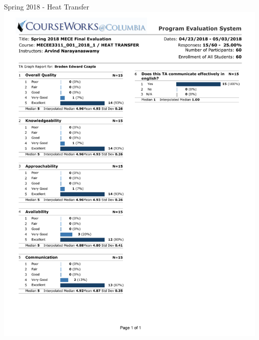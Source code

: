 \newpage Spring 2018 - Heat Transfer
\includegraphics*[width=\textwidth, page=1, trim={0.25in 1in 0.25in 0.25in}]{./Teaching_Evaluations/BradenCzapla_TAEvaluation_Spring2018.pdf}
